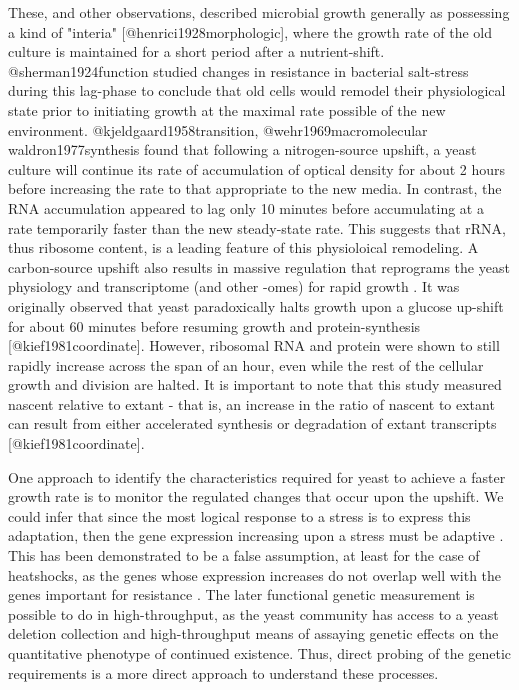 These, and other observations, described microbial growth generally as 
possessing a kind of "interia" [@henrici1928morphologic], where the
growth rate 
of the old culture is maintained for a short period after a
nutrient-shift.
@sherman1924function studied changes in resistance in bacterial
salt-stress 
during this lag-phase to conclude that old cells would remodel their
physiological state prior to initiating growth at the maximal rate
possible of the new environment.
@kjeldgaard1958transition, @wehr1969macromolecular
waldron1977synthesis  found that following a nitrogen-source upshift,
a yeast culture will continue its rate of accumulation of optical
density
for about 2 hours before increasing the rate to that appropriate to
the new
media.
In contrast, the RNA accumulation appeared to lag only 10 minutes
before
accumulating at a rate temporarily faster than the new steady-state
rate.
This suggests that rRNA, thus ribosome content, 
is a leading feature of this physioloical remodeling.
A carbon-source upshift also results in massive regulation 
that reprograms the yeast physiology and transcriptome (and other
-omes) for 
rapid growth \cite{kief1981coordinate}.
It was originally observed that yeast paradoxically halts growth
upon a glucose up-shift for about 60 minutes before resuming
growth and protein-synthesis [@kief1981coordinate]. However,
ribosomal RNA and protein were shown to still rapidly increase
across the span of an hour, even while the rest of the cellular
growth and division are halted. It is important to note that
this study measured nascent relative to extant - that is, an
increase in the ratio of nascent to extant can result from either
accelerated synthesis or degradation of extant transcripts 
[@kief1981coordinate].

One approach to identify the characteristics required for yeast to 
achieve a faster growth rate is to monitor the regulated changes that
occur upon the upshift. We could infer
that since the most logical response to a stress is to express this
adaptation, then the gene expression increasing upon a stress must be
adaptive \parencite{gould}. 
This has been demonstrated to be a false assumption, at least for the
case of heatshocks, as the genes whose expression increases do not 
overlap well with the
genes important for resistance \parencite{lee li botstein}.
The later functional genetic measurement is possible to do in 
high-throughput, as
the yeast community has access to a yeast deletion collection and
high-throughput means of assaying genetic effects on the quantitative
phenotype of continued existence. 
Thus, direct probing of the genetic requirements is a more direct
approach to understand these processes.

